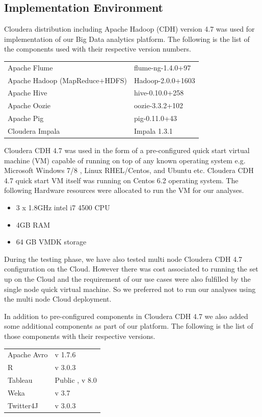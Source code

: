 \subsection{Implementation Environment} \label{env}
Cloudera distribution including Apache Hadoop (CDH) version 4.7 was used for implementation of our Big Data analytics platform. The following is the list of the components used with their respective version numbers.  
\begin{longtable}{@{}p{}p{}@{}}
Apache Flume & flume-ng-1.4.0+97 \\
Apache Hadoop (MapReduce\(+\)HDFS) & Hadoop-2.0.0+1603 \\ 
Apache Hive & hive-0.10.0+258 \\ 
Apache Oozie  & oozie-3.3.2+102 \\
Apache Pig & pig-0.11.0+43 \\ 
Cloudera Impala & Impala 1.3.1 
\end{longtable}
Cloudera CDH 4.7 was used in the form of a pre-configured quick start virtual machine (VM) capable of running on top of any known operating system e.g. Microsoft Windows 7/8 , Linux RHEL/Centos, and Ubuntu etc. Cloudera CDH 4.7 quick start VM itself was running on Centos 6.2 operating system. The following Hardware resources were allocated to run the VM for our analyses.
\begin{itemize}
\item 3 x 1.8GHz intel i7 4500 CPU
\item 4GB RAM 
\item 64 GB VMDK storage
\end{itemize}
During the testing phase, we have also tested multi node Cloudera CDH 4.7 configuration on the Cloud. However there was cost associated to running the set up on the Cloud and the requirement of our use cases were also fulfilled by the single node quick virtual machine. So we preferred not to run our analyses using the multi node Cloud deployment.

In addition to pre-configured components in Cloudera CDH 4.7 we also added some additional components as part of our platform. The following is the list of those components with their respective versions.
\begin{longtable}{@{}p{}p{}@{}}
Apache Avro & v 1.7.6 \\
R & v 3.0.3 \\ 
Tableau & Public , v 8.0 \\ 
Weka  & v 3.7 \\
Twitter4J & v 3.0.3 
\end{longtable}

